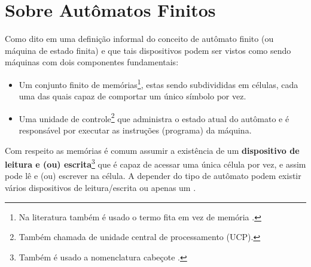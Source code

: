 \section{Sobre Autômatos Finitos}\label{sec:Automata}

Como dito em \cite{valdi2016master, valdi2020phd} uma definição informal do conceito de autômato finito (ou máquina de estado finita) e que tais dispositivos podem ser vistos como sendo máquinas com dois componentes fundamentais:

\begin{itemize}
	\item Um conjunto finito de memórias\footnote{Na literatura também é usado o termo fita em vez de memória \cite{menezes1998LFA}.}, estas sendo subdivididas em células, cada uma das quais capaz de comportar um único símbolo por vez.
	\item Uma unidade de controle\footnote{Também chamada de unidade central de processamento (UCP).} que  administra o estado atual do autômato e é responsável por executar as instruções (programa) da máquina.
\end{itemize}

Com respeito as memórias é comum assumir a existência de um \textbf{dispositivo de leitura e (ou) escrita}\footnote{Também é usado a nomenclatura cabeçote \cite{valdi2016master, valdi2020phd}.} que é capaz de acessar uma única célula por vez, e assim pode lê e (ou) escrever na célula. A depender do tipo de autômato podem existir vários dispositivos de leitura/escrita ou apenas um \cite{benjaLivro2010}.

